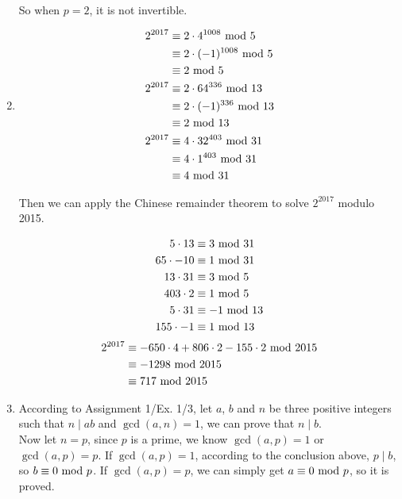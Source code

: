 \documentclass{article}
\renewcommand{\mod}{{\rm\ mod\ }}
\begin{document}
\begin{enumerate}
So when $p=2$, it is not invertible.

\item
\begin{align*}
2^{2017}&\equiv 2\cdot 4^{1008}\mod 5\\
&\equiv 2\cdot (-1)^{1008}\mod 5\\
&\equiv 2\mod 5\\
2^{2017}&\equiv 2\cdot 64^{336}\mod 13\\
&\equiv 2\cdot (-1)^{336}\mod 13\\
&\equiv 2\mod 13\\
2^{2017}&\equiv 4\cdot 32^{403}\mod 31\\
&\equiv 4\cdot 1^{403}\mod 31\\
&\equiv 4\mod 31
\end{align*}

Then we can apply the Chinese remainder theorem to solve $2^{2017}$ modulo 2015.

\begin{align*}
5\cdot13&\equiv 3\mod 31\\
65\cdot-10&\equiv 1\mod 31\\
13\cdot31&\equiv 3\mod 5\\
403\cdot2&\equiv 1\mod 5\\
5\cdot31&\equiv -1\mod 13\\
155\cdot-1&\equiv 1\mod 13
\end{align*}
\begin{align*}
2^{2017}&\equiv -650\cdot4+806\cdot2-155\cdot2\mod 2015\\
&\equiv -1298\mod 2015\\
&\equiv 717\mod 2015\\
\end{align*}

\item
According to Assignment 1/Ex. 1/3, let $a$, $b$ and $n$ be three positive integers such that $n\mid ab$ and $\gcd(a,n)=1$, we can prove that $n\mid b$.\\
Now let $n=p$, since $p$ is a prime, we know $\gcd(a,p)=1$ or $\gcd(a,p)=p$. If $\gcd(a,p)=1$, according to the conclusion above, $p\mid b$, so $b\equiv0\mod p$. If $\gcd(a,p)=p$, we can simply get $a\equiv0\mod p$, so it is proved.

\end{enumerate}
\end{document}
